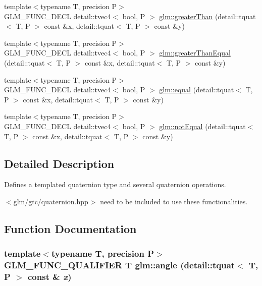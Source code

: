 \begin{CompactItemize}
{\footnotesize template$<$typename T, precision P$>$ }\\GLM\_\-FUNC\_\-DECL detail::tvec4$<$ bool, P $>$ \hyperlink{group__gtc__quaternion_g1ee107eeb1b58dcc19bd56b119b7e14e}{glm::greaterThan} (detail::tquat$<$ T, P $>$ const \&x, detail::tquat$<$ T, P $>$ const \&y)
\item 
{\footnotesize template$<$typename T, precision P$>$ }\\GLM\_\-FUNC\_\-DECL detail::tvec4$<$ bool, P $>$ \hyperlink{group__gtc__quaternion_ge52fe15caa6daaf39c02a5d5827f8473}{glm::greaterThanEqual} (detail::tquat$<$ T, P $>$ const \&x, detail::tquat$<$ T, P $>$ const \&y)
\item 
{\footnotesize template$<$typename T, precision P$>$ }\\GLM\_\-FUNC\_\-DECL detail::tvec4$<$ bool, P $>$ \hyperlink{group__gtc__quaternion_gd867dac3fe25c96ee0cc95a141acd4db}{glm::equal} (detail::tquat$<$ T, P $>$ const \&x, detail::tquat$<$ T, P $>$ const \&y)
\item 
{\footnotesize template$<$typename T, precision P$>$ }\\GLM\_\-FUNC\_\-DECL detail::tvec4$<$ bool, P $>$ \hyperlink{group__gtc__quaternion_g5299d50f9c7692d388f1275cff4e89ce}{glm::notEqual} (detail::tquat$<$ T, P $>$ const \&x, detail::tquat$<$ T, P $>$ const \&y)
\end{CompactItemize}


\subsection{Detailed Description}
Defines a templated quaternion type and several quaternion operations. 

$<$glm/gtc/quaternion.hpp$>$ need to be included to use these functionalities. 

\subsection{Function Documentation}
\hypertarget{group__gtc__quaternion_g48c100d72c9c3295b75c9133ddbb83d1}{
\subsubsection[angle]{\setlength{\rightskip}{0pt plus 5cm}template$<$typename T, precision P$>$ GLM\_\-FUNC\_\-QUALIFIER T glm::angle (detail::tquat$<$ T, P $>$ const \& {\em x})}}
\label{group__gtc__quaternion_g48c100d72c9c3295b75c9133ddbb83d1}



